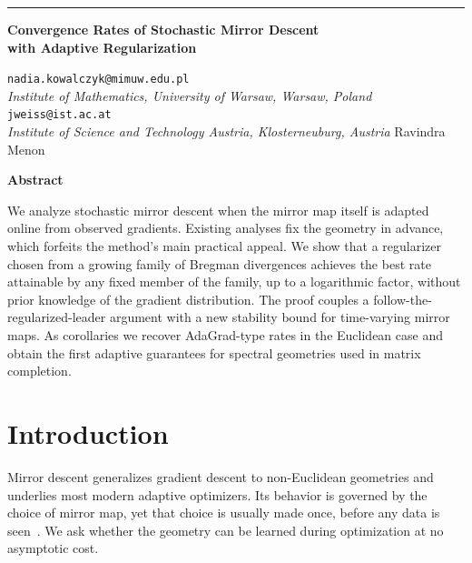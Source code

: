 \documentclass[11pt]{article}
\begin{document}
\vskip 2pt
\noindent\rule{\textwidth}{0.5pt}

\vskip 22pt
\begin{center}
  {\Large\bfseries Convergence Rates of Stochastic Mirror Descent\\ with Adaptive Regularization\par}
\end{center}

\vskip 14pt
 \hfill {\small\texttt{nadia.kowalczyk@mimuw.edu.pl}}\\
{\small\itshape Institute of Mathematics, University of Warsaw, Warsaw, Poland}
\vskip 8pt
 \hfill {\small\texttt{jweiss@ist.ac.at}}\\
{\small\itshape Institute of Science and Technology Austria, Klosterneuburg, Austria}
\vskip 12pt
 {\small Ravindra Menon}

\vskip 18pt
\begin{center}{\bfseries Abstract}\end{center}
\begin{list}{}{\leftmargin=0.3in\rightmargin=0.3in}\item\relax\small
We analyze stochastic mirror descent when the mirror map itself is adapted
online from observed gradients. Existing analyses fix the geometry in
advance, which forfeits the method's main practical appeal. We show that a
regularizer chosen from a growing family of Bregman divergences achieves the
best rate attainable by any fixed member of the family, up to a logarithmic
factor, without prior knowledge of the gradient distribution. The proof
couples a follow-the-regularized-leader argument with a new stability bound
for time-varying mirror maps. As corollaries we recover AdaGrad-type rates in
the Euclidean case and obtain the first adaptive guarantees for spectral
geometries used in matrix completion.
\end{list}
\vskip 4pt

\section{Introduction}
Mirror descent generalizes gradient descent to non-Euclidean geometries and
underlies most modern adaptive optimizers. Its behavior is governed by the
choice of mirror map, yet that choice is usually made once, before any data
is seen~\cite{ferro2023geometry}. We ask whether the geometry can be learned
during optimization at no asymptotic cost.
\end{document}
